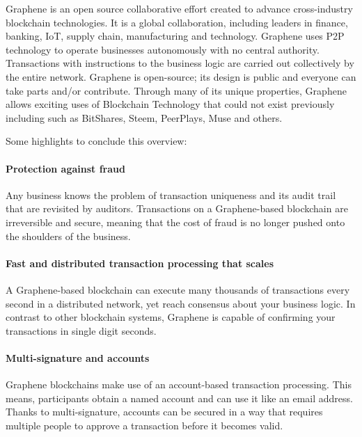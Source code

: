 Graphene is an open source collaborative effort created to advance
cross-industry blockchain technologies. It is a global collaboration,
including leaders in finance, banking, IoT, supply chain, manufacturing
and technology.
Graphene uses P2P technology to operate businesses autonomously
with no central authority. Transactions with instructions to the
business logic are carried out collectively by the entire network.
Graphene is open-source; its design is public and everyone can take
parts and/or contribute. Through many of its unique properties, Graphene allows exciting
uses of Blockchain Technology that could not exist previously including
such as BitShares, Steem, PeerPlays, Muse and others.

Some highlights to conclude this overview:

\paragraph{Protection against fraud}
Any business knows the problem of transaction uniqueness and its audit
trail that are revisited by auditors. Transactions on a Graphene-based
blockchain are irreversible and secure, meaning that the cost of fraud
is no longer pushed onto the shoulders of the business.

\paragraph{Fast and distributed transaction processing that scales}
A Graphene-based blockchain can execute many thousands of transactions
every second in a distributed network, yet reach consensus about your
business logic. In contrast to other blockchain systems, Graphene is
capable of confirming your transactions in single digit seconds.

\paragraph{Multi-signature and accounts}
Graphene blockchains make use of an account-based transaction
processing. This means, participants obtain a named account and can use
it like an email address. Thanks to multi-signature, accounts can be
secured in a way that requires multiple people to approve a transaction
before it becomes valid.

